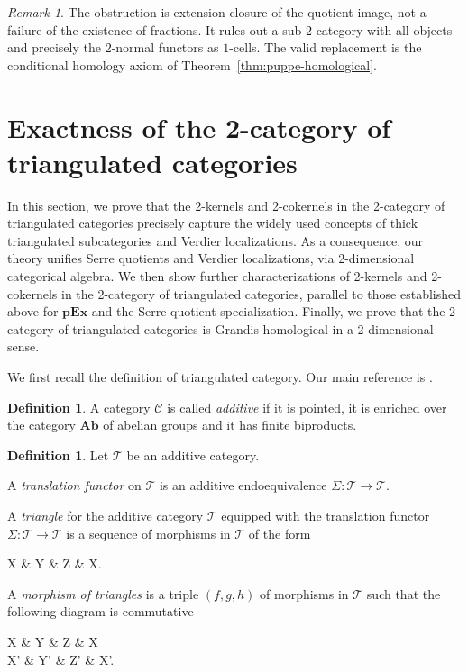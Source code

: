 \documentclass[11pt,reqno,a4paper]{amsart}
\theoremstyle{definition}
\newtheorem{definition}[theorem]{Definition}
\theoremstyle{remark}
\newtheorem{remark}[theorem]{Remark}
\def\dfn#1{{\itshape #1}}
\newcommand{\C}{\mathcal{C}}
\newcommand{\T}{\mathcal{T}}
\newcommand{\0}{\mathbf{0}}
\renewcommand{\1}{\mathbf{1}}
\newcommand{\Ab}{\mathbf{Ab}}
\newcommand{\pExact}{\mathbf{pEx}}
\begin{document}
\begin{remark}
The obstruction is extension closure of the quotient image, not a
failure of the existence of fractions. It rules out a sub-$2$-category
with all objects and precisely the $2$-normal functors
as $1$-cells. The valid replacement is the conditional homology axiom
of Theorem~\ref{thm:puppe-homological}.
\end{remark}



\section{Exactness of the 2-category of triangulated categories}\label{sec:tri-direct}

In this section, we prove that the 2-kernels and 2-cokernels in the 2-category of triangulated categories precisely capture the widely used concepts of thick triangulated subcategories and Verdier localizations. As a consequence, our theory unifies Serre quotients and Verdier localizations, via 2-dimensional categorical algebra. We then show further characterizations of 2-kernels and 2-cokernels in the 2-category of triangulated categories, parallel to those established above for $\pExact$ and the Serre quotient specialization. Finally, we prove that the 2-category of triangulated categories is Grandis homological in a 2-dimensional sense.

We first recall the definition of triangulated category. Our main reference is \cite{Neeman,StacksTri}.

\begin{definition}
    A category $\C$ is called \dfn{additive} if it is pointed, it is enriched over the category $\Ab$ of abelian groups and it has finite biproducts.
\end{definition}

\begin{definition}
Let $\T$ be an additive category.

A \dfn{translation functor} on $\T$ is an additive endoequivalence $\Sigma:\T \to \T$.

A \dfn{triangle} for the additive category $\T$ equipped with the translation functor $\Sigma:\T \to \T$ is a sequence of morphisms in $\T$ of the form
\begin{cd}
X \arrow[r, "u"] \& Y \arrow[r, "v"]  \& Z  \arrow[r, "w"] \&  \Sigma X.
\end{cd}

A \dfn{morphism of triangles} is a triple $(f,g,h)$ of morphisms in $\T$ such that the following diagram is commutative
\begin{cd}
X \arrow[r, "u"] \arrow[d,"f"] \& Y \arrow[r, "v"] \arrow[d,"g"]\& Z  \arrow[r, "w"] \arrow[d,"h"] \&  \Sigma X \arrow[d,"\Sigma f"]\\
X' \arrow[r, "u'"] \& Y' \arrow[r, "v'"]  \& Z'  \arrow[r, "w'"] \&  \Sigma X'.
\end{cd}
\end{definition}
\end{document}
